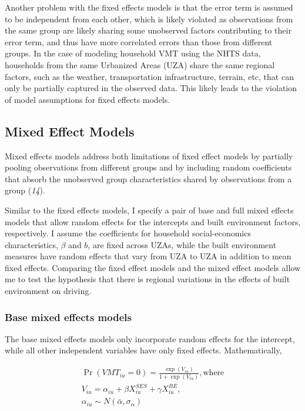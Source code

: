 \documentclass[numbered]{trbunofficial}
\begin{document}
Another problem with the fixed effects models is that the error term is assumed to be independent from each other, which is likely violated as observations from the same group are likely sharing some unobserved factors contributing to their error term, and thus have more correlated errors than those from different groups. In the case of modeling household VMT using the NHTS data, households from the same Urbanized Areas (UZA) share the same regional factors, such as the weather, transportation infrastructure, terrain, etc, that can only be partially captured in the observed data. This likely leads to the violation of model assumptions for fixed effects models.

\hypertarget{mixed-effect-models}{%
\subsection{Mixed Effect Models}\label{mixed-effect-models}}

Mixed effects models address both limitations of fixed effect models by partially pooling observations from different groups and by including random coefficients that absorb the unobserved group characteristics shared by observations from a group (\emph{14}).

Similar to the fixed effects models, I specify a pair of base and full mixed effects models that allow random effects for the intercepts and built environment factors, respectively. I assume the coefficients for household social-economics characteristics, \(\beta\) and \(b\), are fixed across UZAs, while the built environment measures have random effects that vary from UZA to UZA in addition to mean fixed effects. Comparing the fixed effect models and the mixed effect models allow me to test the hypothesis that there is regional variations in the effects of built environment on driving.

\hypertarget{base-mixed-effects-models}{%
\subsubsection{Base mixed effects models}\label{base-mixed-effects-models}}

The base mixed effects models only incorporate random effects for the intercept, while all other independent variables have only fixed effects. Mathematically,

\begin{equation}
\label{eq:mixed0-step1}
\begin{split}
\Pr(VMT_{iu}=0) = \frac{\exp(V_{iu})}{1 + \exp(V_{iu})}, \text{where} \\
V_{iu} = \alpha_{iu} + \beta X_{iu}^{SES} + \gamma X_{iu}^{BE}, \\
\alpha_{iu} \sim N(\bar{\alpha}, \sigma_{\alpha})
\end{split}
\end{equation}
\end{document}

